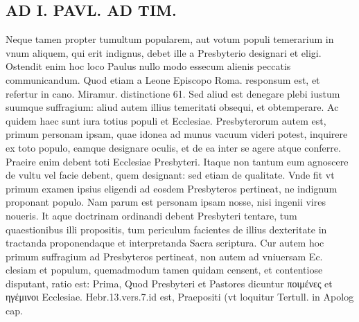 \documentclass{article}
\begin{document}
\begin{pages}
\section*{AD I. PAVL. AD TIM. }
\marginpar{[ p.552 ]}\pstart Neque tamen propter tumultum popularem, aut votum populi temerarium in vnum aliquem, qui erit indignus, debet ille a Presbyterio designari et eligi. Ostendit enim hoc loco Paulus nullo modo essecum alienis peccatis communicandum. Quod etiam a Leone Episcopo Roma. responsum est, et refertur in cano. Miramur. distinctione 61. Sed aliud est denegare plebi iustum suumque suffragium: aliud autem illius temeritati obsequi, et obtemperare. Ac quidem haec sunt iura totius populi et Ecclesiae. Presbyterorum autem est, primum personam ipsam, quae idonea ad munus vacuum videri potest, inquirere ex toto populo, eamque designare oculis, et de ea inter se agere atque conferre. Praeire enim debent toti Ecclesiae Presbyteri. Itaque non tantum eum agnoscere de vultu vel facie debent, quem designant: sed etiam de qualitate. Vnde fit vt primum examen ipsius eligendi ad eosdem Presbyteros pertineat, ne indignum proponant populo. Nam parum est personam ipsam nosse, nisi ingenii vires noueris. It aque doctrinam ordinandi debent Presbyteri tentare, tum quaestionibus illi propositis, tum periculum facientes de illius dexteritate in tractanda proponendaque et interpretanda Sacra scriptura. Cur autem hoc primum suffragium ad Presbyteros pertineat, non autem ad vniuersam Ec. clesiam et populum, quemadmodum tamen quidam censent, et contentiose disputant, ratio est: Prima, Quod Presbyteri et Pastores dicuntur ποιμένες et ηγέμινοι Ecclesiae. Hebr.13.vers.7.id est, Praepositi (vt loquitur Tertull. in Apolog cap.  \pend

\end{pages}
\end{document}
